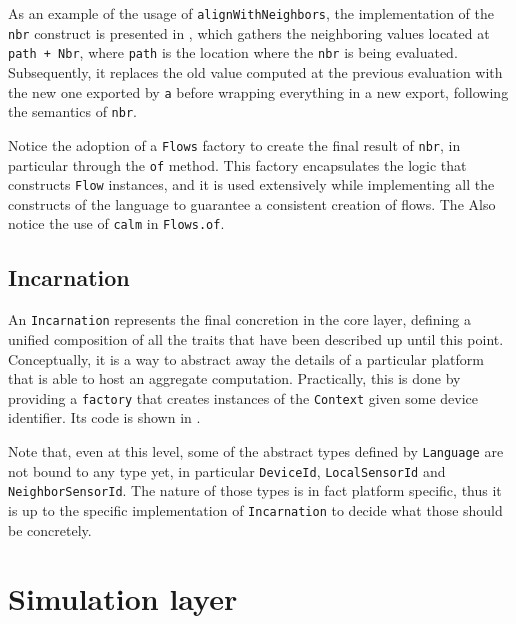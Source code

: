 As an example of the usage of \texttt{alignWithNeighbors}, the implementation of the \texttt{nbr} construct is presented in , which gathers the neighboring values located at \texttt{path + Nbr}, where \texttt{path} is the location where the \texttt{nbr} is being evaluated.
%
Subsequently, it replaces the old value computed at the previous evaluation with the new one exported by \texttt{a} before wrapping everything in a new export, following the semantics of \texttt{nbr}.
%

%
Notice the adoption of a \texttt{Flows} factory to create the final result of \texttt{nbr}, in particular through the \texttt{of} method.
%
This factory encapsulates the logic that constructs \texttt{Flow} instances, and it is used extensively while implementing all the constructs of the language to guarantee a consistent creation of flows.
%
The 
%
Also notice the use of \texttt{calm} in \texttt{Flows.of}.

\subsection{Incarnation}

An \texttt{Incarnation} represents the final concretion in the core layer, defining a unified composition of all the traits that have been described up until this point.
%
Conceptually, it is a way to abstract away the details of a particular platform that is able to host an aggregate computation.
%
Practically, this is done by providing a \texttt{factory} that creates instances of the \texttt{Context} given some device identifier.
%
Its code is shown in .
%


Note that, even at this level, some of the abstract types defined by \texttt{Language} are not bound to any type yet, in particular \texttt{DeviceId}, \texttt{LocalSensorId} and \texttt{NeighborSensorId}.
%
The nature of those types is in fact platform specific, thus it is up to the specific implementation of \texttt{Incarnation} to decide what those should be concretely.

\section{Simulation layer}

